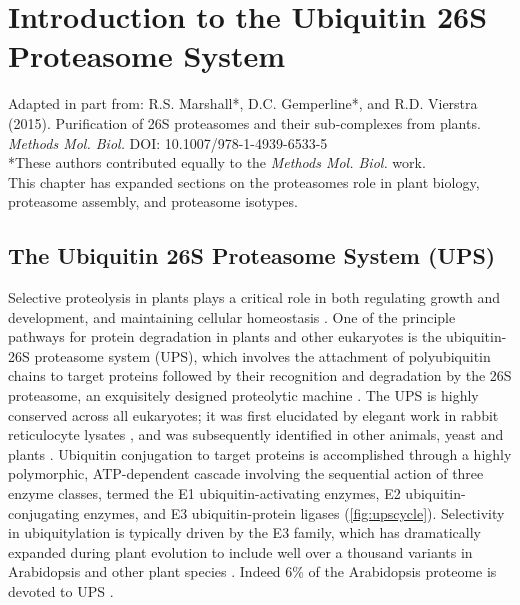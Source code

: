 \chapter{Introduction to the Ubiquitin 26S Proteasome System}

Adapted in part from: R.S. Marshall*, D.C. Gemperline*, and R.D. Vierstra (2015). Purification of 26S proteasomes and their sub-complexes from plants. \textit{Methods Mol. Biol.} DOI: 10.1007/978-1-4939-6533-5 \\

\noindent
*These authors contributed equally to the \textit{Methods Mol. Biol.} work. \\

\noindent
This chapter has expanded sections on the proteasomes role in plant biology, proteasome assembly, and proteasome isotypes. \\

\section{The Ubiquitin 26S Proteasome System (UPS)}
	Selective proteolysis in plants plays a critical role in both regulating growth and development, and maintaining cellular homeostasis \citep{nelson14, smalle04, vierstra93, vierstra09}.  One of the principle pathways for protein degradation in plants and other eukaryotes is the ubiquitin-26S proteasome system (UPS), which involves the attachment of polyubiquitin chains to target proteins followed by their recognition and degradation by the 26S proteasome, an exquisitely designed proteolytic machine \citep{bhattacharyya14, finley09, vierstra09}.  The UPS is highly conserved across all eukaryotes; it was first elucidated by elegant work in rabbit reticulocyte lysates \citep{ciechanover80, ciechanover80-frAQB, etlinger77, hershko80, wilkinson80}, and was subsequently identified in other animals, yeast and plants \citep{ciechanover84, finley84, finley87, glotzer91, hochstrasser91, shanklin87}.  Ubiquitin conjugation to target proteins is accomplished through a highly polymorphic, ATP-dependent cascade involving the sequential action of three enzyme classes, termed the E1 ubiquitin-activating enzymes, E2 ubiquitin-conjugating enzymes, and E3 ubiquitin-protein ligases \citep{berndsen14, smalle04, vierstra09} (\ref{fig:upscycle}).  Selectivity in ubiquitylation is typically driven by the E3 family, which has dramatically expanded during plant evolution to include well over a thousand variants in Arabidopsis and other plant species \citep{hua13, hua11}. Indeed 6\% of the Arabidopsis proteome is devoted to UPS \citep{smalle04}. 


